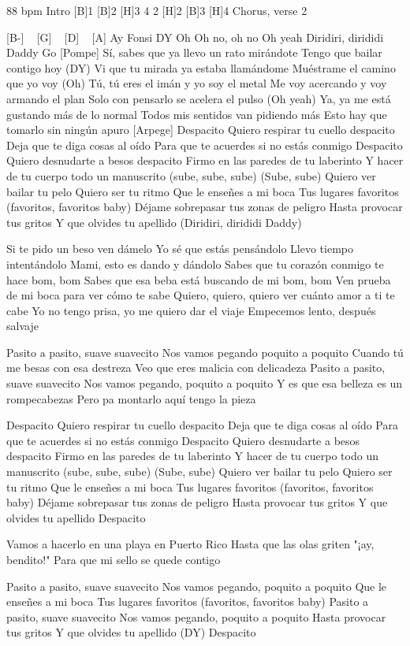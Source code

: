 \begin{guitar}
88 bpm
Intro
[B]1 [B]2 [H]3 4 2 [H]2 [B]3 [H]4
Chorus, verse 2

[B-] ~ [G] ~ [D] ~ [A] 
Ay
Fonsi
DY
Oh
Oh no, oh no
Oh yeah
Diridiri, dirididi Daddy
Go
[Pompe]
Sí, sabes que ya llevo un rato mirándote
Tengo que bailar contigo hoy (DY)
Vi que tu mirada ya estaba llamándome
Muéstrame el camino que yo voy (Oh)
Tú, tú eres el imán y yo soy el metal
Me voy acercando y voy armando el plan
Solo con pensarlo se acelera el pulso (Oh yeah)
Ya, ya me está gustando más de lo normal
Todos mis sentidos van pidiendo más
Esto hay que tomarlo sin ningún apuro
[Arpege]
Despacito
Quiero respirar tu cuello despacito
Deja que te diga cosas al oído
Para que te acuerdes si no estás conmigo
Despacito
Quiero desnudarte a besos despacito
Firmo en las paredes de tu laberinto
Y hacer de tu cuerpo todo un manuscrito (sube, sube, sube)
(Sube, sube)
Quiero ver bailar tu pelo
Quiero ser tu ritmo
Que le enseñes a mi boca
Tus lugares favoritos (favoritos, favoritos baby)
Déjame sobrepasar tus zonas de peligro
Hasta provocar tus gritos
Y que olvides tu apellido (Diridiri, dirididi Daddy)

Si te pido un beso ven dámelo
Yo sé que estás pensándolo
Llevo tiempo intentándolo
Mami, esto es dando y dándolo
Sabes que tu corazón conmigo te hace bom, bom
Sabes que esa beba está buscando de mi bom, bom
Ven prueba de mi boca para ver cómo te sabe
Quiero, quiero, quiero ver cuánto amor a ti te cabe
Yo no tengo prisa, yo me quiero dar el viaje
Empecemos lento, después salvaje

Pasito a pasito, suave suavecito
Nos vamos pegando poquito a poquito
Cuando tú me besas con esa destreza
Veo que eres malicia con delicadeza
Pasito a pasito, suave suavecito
Nos vamos pegando, poquito a poquito
Y es que esa belleza es un rompecabezas
Pero pa montarlo aquí tengo la pieza

Despacito
Quiero respirar tu cuello despacito
Deja que te diga cosas al oído
Para que te acuerdes si no estás conmigo
Despacito
Quiero desnudarte a besos despacito
Firmo en las paredes de tu laberinto
Y hacer de tu cuerpo todo un manuscrito (sube, sube, sube)
(Sube, sube)
Quiero ver bailar tu pelo
Quiero ser tu ritmo
Que le enseñes a mi boca
Tus lugares favoritos (favoritos, favoritos baby)
Déjame sobrepasar tus zonas de peligro
Hasta provocar tus gritos
Y que olvides tu apellido
Despacito

Vamos a hacerlo en una playa en Puerto Rico
Hasta que las olas griten "¡ay, bendito!"
Para que mi sello se quede contigo

Pasito a pasito, suave suavecito
Nos vamos pegando, poquito a poquito
Que le enseñes a mi boca
Tus lugares favoritos (favoritos, favoritos baby)
Pasito a pasito, suave suavecito
Nos vamos pegando, poquito a poquito
Hasta provocar tus gritos
Y que olvides tu apellido (DY)
Despacito
\end{guitar}